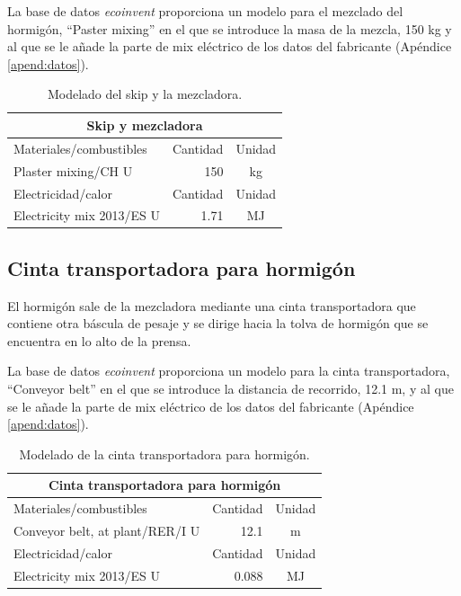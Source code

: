 La base de datos \textit{ecoinvent} proporciona un modelo para el mezclado del hormigón, ``Paster mixing'' en el que se introduce la masa de la mezcla, 150 \si{kg} y al que se le añade la parte de mix eléctrico de los datos del fabricante (Apéndice \ref{apend:datos}).

\begin{table}[!htb]
\centering
\begin{tabular}{p{8cm}rc}
\toprule
\multicolumn{3}{c}{Skip y mezcladora}\\
\midrule
Materiales/combustibles & Cantidad & Unidad\\
\midrule
Plaster mixing/CH U & 150 & \si{kg}\\
\midrule
Electricidad/calor & Cantidad & Unidad\\
\midrule
Electricity mix 2013/ES U & 1.71 & \si{MJ}\\
\bottomrule
\end{tabular}
\caption{Modelado del skip y la mezcladora.}
\label{modeladoskip}
\end{table}

\subsection{Cinta transportadora para hormigón}

El hormigón sale de la mezcladora mediante una cinta transportadora que contiene otra báscula de pesaje y se dirige hacia la tolva de hormigón que se encuentra en lo alto de la prensa.

La base de datos \textit{ecoinvent} proporciona un modelo para la cinta transportadora, ``Conveyor belt'' en el que se introduce la distancia de recorrido, 12.1 \si{m}, y al que se le añade la parte de mix eléctrico de los datos del fabricante (Apéndice \ref{apend:datos}).

\begin{table}[!htb]
\centering
\begin{tabular}{p{8cm}rc}
\toprule
\multicolumn{3}{c}{Cinta transportadora para hormigón}\\
\midrule
Materiales/combustibles & Cantidad & Unidad\\
\midrule
Conveyor belt, at plant/RER/I U & 12.1 & \si{m}\\
\midrule
Electricidad/calor & Cantidad & Unidad\\
\midrule
Electricity mix 2013/ES U & 0.088 & \si{MJ}\\
\bottomrule
\end{tabular}
\caption{Modelado de la cinta transportadora para hormigón.}
\label{modeladodecintahormigon}
\end{table}

